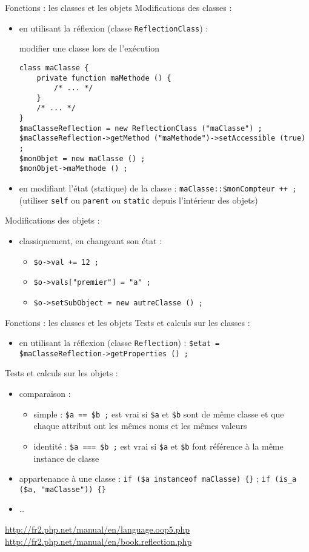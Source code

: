 \begin{frame}[containsverbatim]{Fonctions : les classes et les objets}
	Modifications des classes :
	\begin{itemize}
		\item en utilisant la réflexion (classe \texttt{ReflectionClass}) :
		\begin{block}{modifier une classe lors de l’exécution}
			\begin{lstlisting}
class maClasse { 
	private function maMethode () {
		/* ... */
	}
	/* ... */
}
$maClasseReflection = new ReflectionClass ("maClasse") ;
$maClasseReflection->getMethod ("maMethode")->setAccessible (true) ;
$monObjet = new maClasse () ;
$monObjet->maMethode () ;
			\end{lstlisting}
		\end{block}
			\item en modifiant l’état (statique) de la classe : \lstinline~maClasse::$monCompteur ++ ;~ (utiliser \texttt{self} ou \texttt{parent} ou \texttt{static} depuis l’intérieur des objets)
	\end{itemize}
	Modifications des objets :
	\begin{itemize}
		\item classiquement, en changeant son état : 
		\begin{itemize}
			\item \lstinline~$o->val += 12 ;~
			\item \lstinline~$o->vals["premier"] = "a" ;~
			\item \lstinline~$o->setSubObject = new autreClasse () ;~
		\end{itemize}
	\end{itemize}
\end{frame}
 
\begin{frame}[containsverbatim]{Fonctions : les classes et les objets}
	Tests et calculs sur les classes :
	\begin{itemize}
		\item en utilisant la réflexion (classe \texttt{Reflection}) : \lstinline~$etat = $maClasseReflection->getProperties () ;~
	\end{itemize}
	Tests et calculs sur les objets :
	\begin{itemize}
		\item comparaison : 
		\begin{itemize}
			\item simple : \lstinline~$a == $b ;~ est vrai si \texttt{\$a} et \texttt{\$b} sont de même classe et que chaque attribut ont les mêmes noms et les mêmes valeurs
			\item identité : \lstinline~$a === $b ;~ est vrai si \texttt{\$a} et \texttt{\$b} font référence à la même instance de classe
		\end{itemize}
		\item appartenance à une classe : \lstinline~if ($a instanceof maClasse) {}~ ; \lstinline~if (is_a ($a, "maClasse")) {}~
		\item \ldots
	\end{itemize}
	\url{http://fr2.php.net/manual/en/language.oop5.php}
	\url{http://fr2.php.net/manual/en/book.reflection.php}
\end{frame}
